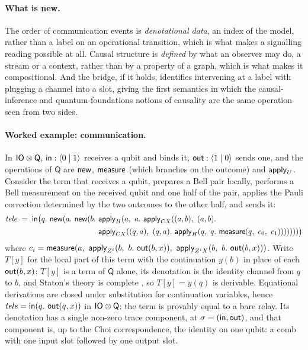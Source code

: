 \paragraph{What is new.} The order of communication events is \emph{denotational data}, an index of the model, rather than a label on an operational transition, which is what makes a signalling reading possible at all. Causal structure is \emph{defined} by what an observer may do, a stream or a context, rather than by a property of a graph, which is what makes it compositional. And the bridge, if it holds, identifies intervening at a label with plugging a channel into a slot, giving the first semantics in which the causal-inference and quantum-foundations notions of causality are the same operation seen from two sides.

\paragraph{Worked example: communication.} In $\mathsf{IO}\otimes\mathsf{Q}$, $\mathsf{in}: \langle 0 \mid 1\rangle$ receives a qubit and binds it, $\mathsf{out}: \langle 1\mid 0\rangle$ sends one, and the operations of $\mathsf{Q}$ are $\mathsf{new}$, $\mathsf{measure}$ (which branches on the outcome) and $\mathsf{apply}_{U}$. Consider the term that receives a qubit, prepares a Bell pair locally, performs a Bell measurement on the received qubit and one half of the pair, applies the Pauli correction determined by the two outcomes to the other half, and sends it:
\begin{align*}
\mathit{tele} \;=\; \opin\big(q.\ \opnew(a.\ \opnew(b.\ &\applyU{H}(a,\ a.\ \applyU{CX}((a,b),\ (a,b).\\
&\applyU{CX}((q,a),\ (q,a).\ \applyU{H}(q,\ q.\ \opmeasure(q,\ c_{0},\ c_{1})))))))\big)
\end{align*}
where $c_{i} = \opmeasure(a,\ \applyU{Z^{i}}(b,\ b.\ \opout(b, x)),\ \applyU{Z^{i}X}(b,\ b.\ \opout(b, x)))$. Write $T[y]$ for the local part of this term with the continuation $y(b)$ in place of each $\mathsf{out}(b,x)$; $T[y]$ is a term of $\mathsf{Q}$ alone, its denotation is the identity channel from $q$ to $b$, and Staton's theory is complete \cite{statonpopl15}, so $T[y] = y(q)$ is derivable. Equational derivations are closed under substitution for continuation variables, hence $\mathit{tele} = \mathsf{in}(q.\ \mathsf{out}(q, x))$ in $\mathsf{IO}\otimes\mathsf{Q}$: the term is provably equal to a bare relay. Its denotation has a single non-zero trace component, at $\sigma=(\mathsf{in},\mathsf{out})$, and that component is, up to the Choi correspondence, the identity on one qubit: a comb with one input slot followed by one output slot.

